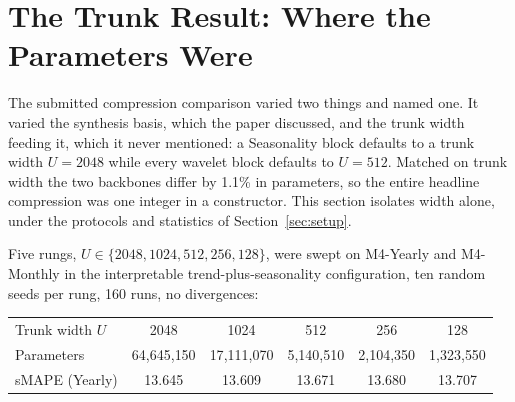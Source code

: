 %
%

\section{The Trunk Result: Where the Parameters Were}
\label{sec:trunk}

The submitted compression comparison varied two things and named one. It
varied the synthesis basis, which the paper discussed, and the trunk width
feeding it, which it never mentioned: a Seasonality block defaults to a
trunk width $U = 2048$ while every wavelet block defaults to $U = 512$.
Matched on trunk width the two backbones differ by 1.1\% in parameters, so
the entire headline compression was one integer in a constructor. This
section isolates width alone, under the protocols and statistics of
Section~\ref{sec:setup}.

Five rungs, $U \in \{2048, 1024, 512, 256, 128\}$, were swept on M4-Yearly
and M4-Monthly in the interpretable trend-plus-seasonality configuration,
ten random seeds per rung, 160 runs, no divergences:

\begin{center}
\small
\begin{tabular}{lccccc}
\toprule
Trunk width $U$ & 2048 & 1024 & 512 & 256 & 128 \\
Parameters & 64{,}645{,}150 & 17{,}111{,}070 & 5{,}140{,}510 & 2{,}104{,}350 & 1{,}323{,}550 \\
sMAPE (Yearly) & 13.645 & 13.609 & 13.671 & 13.680 & 13.707 \\
\bottomrule
\end{tabular}
\end{center}

